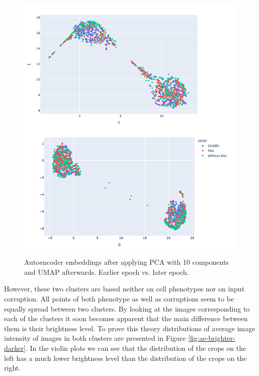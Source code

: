 \begin{figure}[htb]
	\begin{center}
		\includegraphics[width=0.8\linewidth]{bilder/ae-embeddings/pca-umap-clusters.png}
		\caption{Autoencoder embeddings after applying PCA with 10 components and UMAP afterwards. Earlier epoch vs.  later epoch.}\label{fig:ae-pca-umap-clustered}
	\end{center}
\end{figure}

However, these two clusters are based neither on cell phenotypes nor on input corruption. All points of both phenotype as well as corruptions seem to be equally spread between two clusters. By looking at the images corresponding to each of the clusters it soon becomes apparent that the main difference between them is their brightness level. To prove this theory distributions of average image intensity of images in both clusters are presented in Figure \ref{fig:ae-brighter-darker}. In the violin plots we can see that the distribution of the crops on the left has a much lower brightness level than the distribution of the crops on the right.

